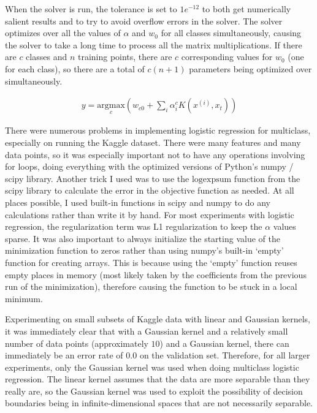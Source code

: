\documentclass[10pt]{article}
\begin{document}
When the solver is run, the tolerance is set to $1e^{-12}$ to both get numerically salient results and to try to avoid overflow errors in the solver. The solver optimizes over all the values of $\alpha$ and $w_0$ for all classes simultaneously, causing the solver to take a long time to process all the matrix multiplications. If there are $c$ classes and $n$ training points, there are $c$ corresponding values for $w_0$ (one for each class), so there are a total of $c(n + 1)$ parameters being optimized over simultaneously.

\begin{subequations}
	\begin{align}
		y = \underset{c}{\text{argmax}} \left(w_{c0} + \sum_i \alpha^c_i K(x^{(i)}, x_t)\right)
	\end{align}
	\label{eq:multiclass-lr}
\end{subequations}

There were numerous problems in implementing logistic regression for multiclass, especially on running the Kaggle dataset. There were many features and many data points, so it was especially important not to have any operations involving for loops, doing everything with the optimized versions of Python's numpy / scipy library. Another trick I used was to use the $\text{logexpsum}$ function from the scipy library to calculate the error in the objective function as needed. At all places possible, I used built-in functions in scipy and numpy to do any calculations rather than write it by hand. For most experiments with logistic regression, the regularization term was L1 regularization to keep the $\alpha$ values sparse. It was also important to always initialize the starting value of the minimization function to zeros rather than using numpy's built-in `empty' function for creating arrays. This is because using the `empty' function reuses empty places in memory (most likely taken by the coefficients from the previous run of the minimization), therefore causing the function to be stuck in a local minimum.

Experimenting on small subsets of Kaggle data with linear and Gaussian kernels, it was immediately clear that with a Gaussian kernel and a relatively small number of data points (approximately $10$) and a Gaussian kernel, there can immediately be an error rate of $0.0$ on the validation set. Therefore, for all larger experiments, only the Gaussian kernel was used when doing multiclass logistic regression. The linear kernel assumes that the data are more separable than they really are, so the Gaussian kernel was used to exploit the possibility of decision boundaries being in infinite-dimensional spaces that are not necessarily separable.
\end{document}
